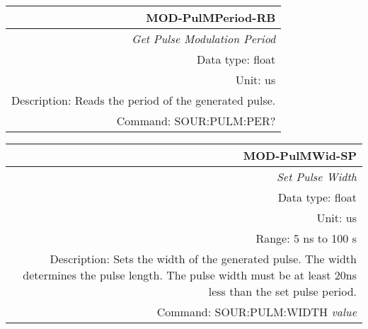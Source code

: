 \documentclass[openany]{article}
\begin{document}
		\begin{tabular}{N}
			\hline
			\bfseries MOD-PulMPeriod-RB \\ \hline
			\emph{Get Pulse Modulation Period} \\
			Data type: float \\
			Unit: us \\
			Description: Reads the period of the generated pulse. \\
			Command: SOUR:PULM:PER? \\

		\end{tabular}
%
		\begin{tabular}{N}
			\hline
			\bfseries MOD-PulMWid-SP \\ \hline
			\emph{Set Pulse Width} \\
			Data type: float \\
			Unit: us \\ 
			Range: 5 ns to 100 s \\
			Description: Sets the width of the generated pulse. The width determines the pulse length. The pulse width must be at least 20ns less than the set pulse period. \\
			Command: SOUR:PULM:WIDTH \emph{value} \\
			
		\end{tabular}
\end{document}
